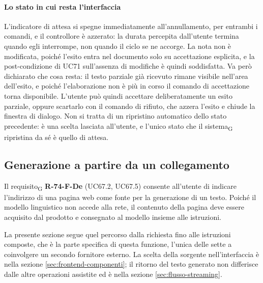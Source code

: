 \documentclass[a4paper, 10pt]{article}
\begin{document}
\paragraph{Lo stato in cui resta l'interfaccia}
L'indicatore di attesa si spegne immediatamente all'annullamento, per entrambi i comandi, e il controllore è azzerato: la durata percepita dall'utente termina quando egli interrompe, non quando il ciclo se ne accorge. La nota non è modificata, poiché l'esito entra nel documento solo su accettazione esplicita, e la post-condizione di UC71 sull'assenza di modifiche è quindi soddisfatta. Va però dichiarato che cosa resta: il testo parziale già ricevuto rimane visibile nell'area dell'esito, e poiché l'elaborazione non è più in corso il comando di accettazione torna disponibile. L'utente può quindi accettare deliberatamente un esito parziale, oppure scartarlo con il comando di rifiuto, che azzera l'esito e chiude la finestra di dialogo. Non si tratta di un ripristino automatico dello stato precedente: è una scelta lasciata all'utente, e l'unico stato che il sistema\textsubscript{G} ripristina da sé è quello di attesa.


\subsection{Generazione a partire da un collegamento}
\label{sec:flusso-collegamento}
Il requisito\textsubscript{G} \textbf{R-74-F-De} (UC67.2, UC67.5) consente all'utente di indicare l'indirizzo di una pagina web come fonte per la generazione di un testo. Poiché il modello linguistico non accede alla rete, il contenuto della pagina deve essere acquisito dal prodotto e consegnato al modello insieme alle istruzioni.

La presente sezione segue quel percorso dalla richiesta fino alle istruzioni composte, che è la parte specifica di questa funzione, l'unica delle sette a coinvolgere un secondo fornitore esterno. La scelta della sorgente nell'interfaccia è nella sezione \ref{sec:frontend-componenti}; il ritorno del testo generato non differisce dalle altre operazioni assistite ed è nella sezione \ref{sec:flusso-streaming}.
\end{document}

